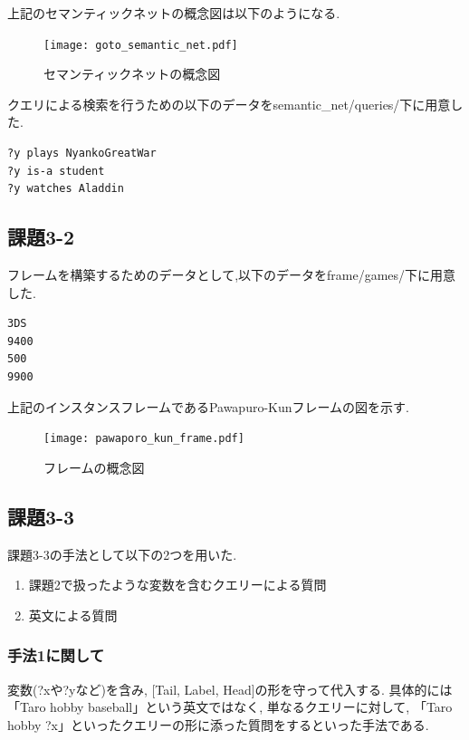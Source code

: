 ﻿\documentclass[uplatex,12pt]{jsarticle}
\begin{document}
上記のセマンティックネットの概念図は以下のようになる.

\begin{figure}[htbp]
 \begin{center}
  \texttt{[image: goto\_semantic\_net.pdf]}
 \end{center}
 \caption[]{セマンティックネットの概念図}\label{fig:fig1.1}
\end{figure}

クエリによる検索を行うための以下のデータをsemantic\_net/queries/下に用意した.\\

\begin{lstlisting}[caption=semantic\_net/queries/goto.txt, label=mid]
?y plays NyankoGreatWar
?y is-a student
?y watches Aladdin
\end{lstlisting}
\subsection{課題3-2}
フレームを構築するためのデータとして,以下のデータをframe/games/下に用意した.
\begin{lstlisting}[caption=frame/games/Pawapuro-Kun.txt, label=mid]
3DS
9400
500
9900
\end{lstlisting}

上記のインスタンスフレームであるPawapuro-Kunフレームの図を示す.
\begin{figure}[htbp]
 \begin{center}
  \texttt{[image: pawaporo\_kun\_frame.pdf]}
 \end{center}
 \caption[]{フレームの概念図}\label{fig:fig1.1}
\end{figure}

\subsection{課題3-3}
課題3-3の手法として以下の2つを用いた.

\begin{enumerate}
\item 課題2で扱ったような変数を含むクエリーによる質問
\item 英文による質問
\end{enumerate}

\subsubsection{手法1に関して}
変数(?xや?yなど)を含み, [Tail, Label, Head]の形を守って代入する. 具体的には「Taro hobby baseball」という英文ではなく, 単なるクエリーに対して, 「Taro hobby ?x」といったクエリーの形に添った質問をするといった手法である.
\end{document}
